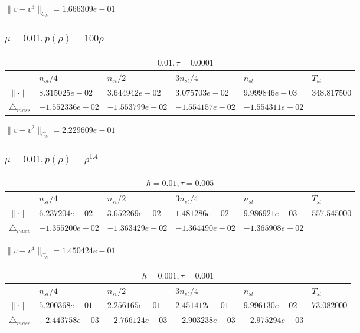 $\|v-v^{3}\|_{C_h} = 1.666309e-01$

\subsubsection{$\mu = 0.01, p(\rho) = 100\rho $}

\begin{tabular}{*{6}{|l}|}
    \hline
     \\
    \hline
    &$n_{st}/4 $&$ n_{st}/2$&$3n_{st}/4$&$n_{st}$&$T_{st}$ \\
    \hline
$\|\cdot \|$& $8.315025e-02$ & $3.644942e-02$ & $3.075703e-02$ & $9.999846e-03$ &$348.817500$\\
\hline
$\triangle_{mass}$& $-1.552336e-02$ & $-1.553799e-02$ & $-1.554157e-02$ & $-1.554311e-02$ &\\
\hline
\end{tabular}

$\|v-v^{2}\|_{C_h} = 2.229609e-01$
\subsubsection{$\mu = 0.01, p(\rho) = \rho^{1.4} $}

\begin{tabular}{*{6}{|l}|}
    \hline
     \\
    \hline
    &$n_{st}/4 $&$ n_{st}/2$&$3n_{st}/4$&$n_{st}$&$T_{st}$ \\
    \hline
$\|\cdot \|$& $6.237204e-02$ & $3.652269e-02$ & $1.481286e-02$ & $9.986921e-03$ &$557.545000$\\
\hline
$\triangle_{mass}$& $-1.355200e-02$ & $-1.363429e-02$ & $-1.364490e-02$ & $-1.365908e-02$ &\\
\hline
\end{tabular}

$\|v-v^{4}\|_{C_h} = 1.450424e-01$


\begin{tabular}{*{6}{|l}|}
    \hline
     \\
    \hline
    &$n_{st}/4 $&$ n_{st}/2$&$3n_{st}/4$&$n_{st}$&$T_{st}$ \\
    \hline
$\|\cdot \|$& $5.200368e-01$ & $2.256165e-01$ & $2.451412e-01$ & $9.996130e-02$ &$73.082000$\\
\hline
$\triangle_{mass}$& $-2.443758e-03$ & $-2.766124e-03$ & $-2.903238e-03$ & $-2.975294e-03$ &\\
\hline    
\end{tabular}

